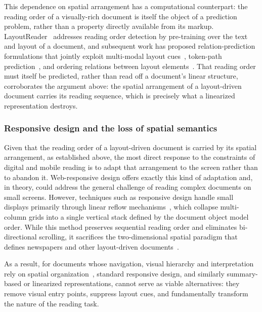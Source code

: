 This dependence on spatial arrangement has a computational counterpart: the reading order of a visually-rich document is itself the object of a prediction problem, rather than a property directly available from its markup. LayoutReader~\cite{wang_layoutreader_2021} addresses reading order detection by pre-training over the text and layout of a document, and subsequent work has proposed relation-prediction formulations that jointly exploit multi-modal layout cues~\cite{qiao2024}, token-path prediction~\cite{zhang2023}, and ordering relations between layout elements~\cite{zhang_modeling_2024}. That reading order must itself be predicted, rather than read off a document's linear structure, corroborates the argument above: the spatial arrangement of a layout-driven document carries its reading sequence, which is precisely what a linearized representation destroys.

\subsubsection{Responsive design and the loss of spatial semantics}
\label{sec:sota-responsive}

Given that the reading order of a layout-driven document is carried by its spatial arrangement, as established above, the most direct response to the constraints of digital and mobile reading is to adapt that arrangement to the screen rather than to abandon it. Web-responsive design offers exactly this kind of adaptation and, in theory, could address the general challenge of reading complex documents on small screens. However, techniques such as responsive design handle small displays primarily through linear reflow mechanisms~\cite{reflow, marcotte_responsive_2010, responsive-design}, which collapse multi-column grids into a single vertical stack defined by the document object model order. While this method preserves sequential reading order and eliminates bi-directional scrolling, it sacrifices the two-dimensional spatial paradigm that defines newspapers and other layout-driven documents~\cite{chesham_master_2003, chiou_2024}.

As a result, for documents whose navigation, visual hierarchy and interpretation rely on spatial organization~\cite{holmqvist_role_2005, ohara_comparison_1997}, standard responsive design, and similarly summary-based or linearized representations, cannot serve as viable alternatives: they remove visual entry points, suppress layout cues, and fundamentally transform the nature of the reading task.

